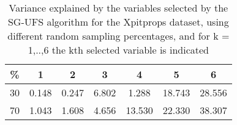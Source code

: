 \begin{table}
	\begin{center}
		\begin{tabular}{c c c c c c c}
			\% & 1 & 2 & 3 & 4 & 5 & 6 \\
			\hline
			30 & 0.148 & 0.247 & 6.802 & 1.288 & 18.743 & 28.556 \\
			70 & 1.043 & 1.608 & 4.656 & 13.530 & 22.330 & 38.307 \\
		\end{tabular}
	\end{center}
	\caption{Variance explained by the variables selected by the SG-UFS algorithm for the Xpitprops dataset, using different random sampling percentages, and for k = 1,..,6 the kth selected variable is indicated}
\end{table}